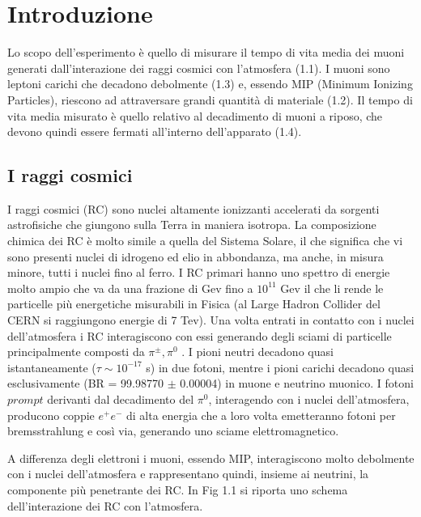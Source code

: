\documentclass{standalone}
\begin{document}
	\pagestyle{fancy}
	\lhead{\rightmark}
	\rhead{\thepage}

\chapter{Introduzione}
Lo scopo dell'esperimento \`e quello di misurare il tempo di vita media dei muoni generati dall'interazione dei raggi cosmici con l'atmosfera (1.1). I muoni sono leptoni carichi che decadono debolmente (1.3) e, essendo MIP (Minimum Ionizing Particles), riescono ad attraversare grandi quantit\`a di materiale (1.2). Il tempo di vita media misurato \`e quello relativo al decadimento di muoni a riposo, che devono quindi essere fermati all'interno dell'apparato (1.4).

\section{I raggi cosmici}
I raggi cosmici (RC) sono nuclei altamente ionizzanti accelerati da sorgenti astrofisiche che giungono sulla Terra in maniera isotropa. La composizione chimica dei RC \`e molto simile a quella del Sistema Solare, il che significa che vi sono presenti nuclei di idrogeno ed elio in abbondanza, ma anche, in misura minore,  tutti i nuclei fino al ferro.
I RC primari hanno uno spettro di energie molto ampio che va da una frazione di Gev fino a $10^{11}$ Gev il che li rende le particelle pi\`u energetiche misurabili in Fisica (al Large Hadron Collider del CERN si raggiungono energie di 7 Tev).
Una volta entrati in contatto con i nuclei dell'atmosfera i RC interagiscono con essi generando degli sciami di particelle principalmente composti da $\pi^\pm, \pi^0$ \cite{Spurio}.
I pioni neutri decadono quasi istantaneamente ($\tau \sim 10^{-17}$ s) in due fotoni, mentre i pioni carichi decadono quasi esclusivamente (BR = 99.98770 $\pm$ 0.00004) in muone e neutrino muonico.
I fotoni $prompt$ derivanti dal decadimento del $\pi^0$, interagendo con i nuclei dell'atmosfera, producono coppie $e^+e^-$ di alta energia che a loro volta emetteranno fotoni per bremsstrahlung e cos\`i via, generando uno sciame elettromagnetico.

A differenza degli elettroni i muoni, essendo MIP, interagiscono molto debolmente con i nuclei dell'atmosfera e rappresentano quindi, insieme ai neutrini, la componente pi\`u penetrante dei RC. In Fig 1.1 si riporta uno schema dell'interazione dei RC con l'atmosfera.
\end{document}
